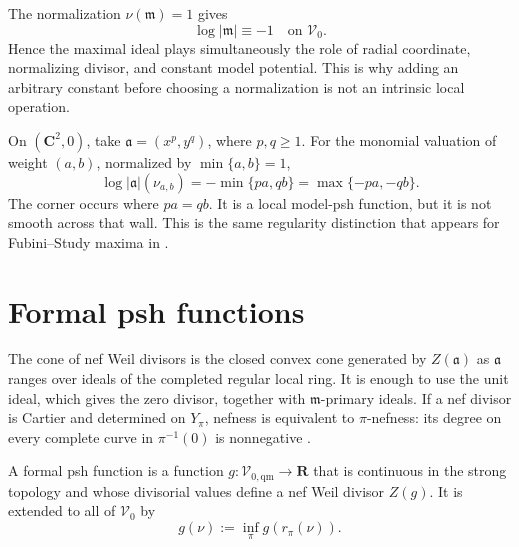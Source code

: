 \begin{example}
The normalization $\nu(\mathfrak m)=1$ gives
\[
                         \log|\mathfrak m|\equiv-1
                         \quad\text{on }\mathcal V_0.
\tag{70.12}\label{eq:local-maximal-ideal-constant}
\]
Hence the maximal ideal plays simultaneously the role of radial coordinate,
normalizing divisor, and constant model potential.  This is why adding an
arbitrary constant before choosing a normalization is not an intrinsic local
operation.
\end{example}

\begin{example}
On $(\mathbf C^2,0)$, take
$\mathfrak a=(x^p,y^q)$, where $p,q\geq1$.  For the monomial valuation of weight
$(a,b)$, normalized by $\min\{a,b\}=1$,
\[
                   \log|\mathfrak a|(\nu_{a,b})
                    =-\min\{pa,qb\}
                    =\max\{-pa,-qb\}.
\tag{70.13}\label{eq:local-monomial-ideal}
\]
The corner occurs where $pa=qb$.  It is a local model-psh function, but
it is not smooth across that wall.  This is the same regularity distinction
that appears for Fubini--Study maxima in .
\end{example}

\section{Formal psh functions}
\label{sec:local-formal-psh}

The cone of nef Weil divisors is the closed convex cone generated by
$Z(\mathfrak a)$ as $\mathfrak a$ ranges over ideals of the completed
regular local ring.  It is enough to use the unit ideal, which gives the zero
divisor, together with $\mathfrak m$-primary ideals.  If a nef divisor is
Cartier and determined on $Y_\pi$, nefness is equivalent to
$\pi$-nefness: its degree on every complete curve in $\pi^{-1}(0)$ is
nonnegative \cite[Proposition~2.2]{BFJ08}.

\begin{definition}
\label{def:local-formal-psh}
A formal psh function is a function
$g:\mathcal V_{0,\mathrm{qm}}\to\mathbf R$ that is continuous in the
strong topology and whose divisorial values define a nef Weil divisor
$Z(g)$.  It is extended to all of $\mathcal V_0$ by
\[
                           g(\nu):=\inf_\pi g(r_\pi(\nu)).
\tag{70.14}\label{eq:local-formal-extension}
\]
\end{definition}

